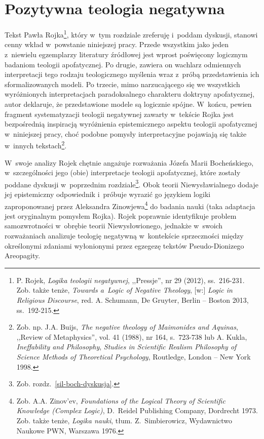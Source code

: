 \chapter{Pozytywna teologia negatywna}\label{sil-pozytywna}






Tekst Pawła Rojka\footnote{ P. Rojek, \textit{Logika teologii negatywnej}, ,,Pressje'', nr 29 (2012), ss.~216-231. Zob. także tenże, \textit{Towards a~Logic of Negative Theology}, [w:] \textit{Logic in Religious Discourse}, red. A. Schumann, De Gruyter, Berlin -- Boston 2013, ss.~192-215.}, który w~tym rozdziale zreferuję i~poddam dyskusji, stanowi cenny wkład w~powstanie niniejszej pracy. Przede wszystkim jako jeden z~niewielu egzemplarzy literatury źródłowej jest wprost poświęcony logicznym badaniom teologii apofatycznej. Po drugie, zawiera on wachlarz odmiennych interpretacji tego rodzaju teologicznego myślenia wraz z~próbą przedstawienia ich sformalizowanych modeli. Po trzecie, mimo narzucającego się we wszystkich wyróżnionych interpretacjach paradoksalnego charakteru doktryny apofatycznej, autor deklaruje, że przedstawione modele są logicznie spójne. W~końcu, pewien fragment systematyzacji teologii negatywnej zawarty w~tekście Rojka jest bezpośrednią inspiracją wyróżnienia epistemicznego aspektu teologii apofatycznej w~niniejszej pracy, choć podobne pomysły interpretacyjne pojawiają się także w~innych tekstach\footnote{ Zob. np. J.A. Buijs, \textit{The negative theology of Maimonides and Aquinas}, ,,Review of Metaphysics'', vol. 41 (1988), nr 164, s.~723-738 lub A. Kukla, \textit{Ineffability and Philosophy}, \textit{Studies in Scientific Realism Philosophy of Science Methods of Theoretical Psychology}, Routledge, London -- New York 1998.}.

W~swoje analizy Rojek chętnie angażuje rozważania Józefa Marii Bocheńskiego, w~szczególności jego (obie) interpretacje teologii apofatycznej, które zostały poddane dyskusji w~poprzednim rozdziale\footnote{ Zob. rozdz.~\ref{sil-boch-dyskusja}.}. Obok teorii Niewysławialnego dodaje jej epistemiczny odpowiednik i~próbuje wyrazić go językiem logiki zaproponowanej przez Aleksandra Zinowjewa\footnote{ Zob. A.A. Zinov'ev, \textit{Foundations of the Logical Theory of Scientific Knowledge (Complex Logic)}, D.~Reidel Publishing Company, Dordrecht 1973. Zob. także tenże, \textit{Logika nauki}, tłum. Z.~Simbierowicz, Wydawnictwo Naukowe PWN, Warszawa 1976.} do badania nauki (taka adaptacja jest oryginalnym pomysłem Rojka). Rojek poprawnie identyfikuje problem samozwrotności w~obrębie teorii Niewysłowionego, jednakże w~swoich rozważaniach analizuje teologię negatywną w~kontekście sprzeczności między określonymi zdaniami
wyłonionymi
przez egzegezę tekstów Pseudo-Dionizego Areopagity.

